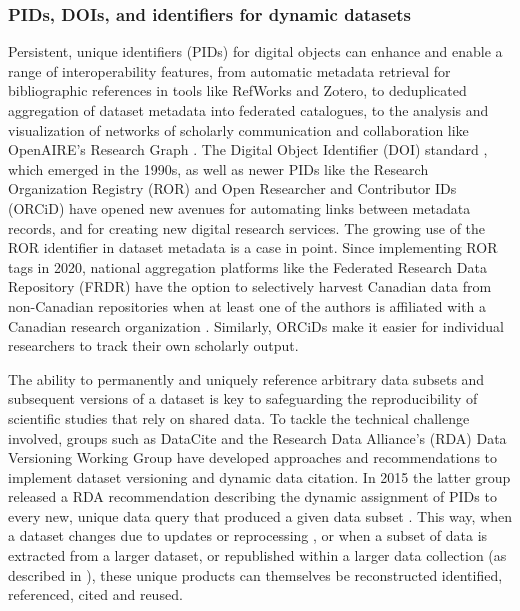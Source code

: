 \documentclass{interact}
\begin{document}
\subsubsection{PIDs, DOIs, and identifiers for dynamic datasets}

Persistent, unique identifiers (PIDs) for digital objects can enhance and enable a range of interoperability features, from automatic metadata retrieval for bibliographic references in tools like RefWorks and Zotero, to deduplicated aggregation of dataset metadata into federated catalogues, to the analysis and visualization of networks of scholarly communication and collaboration like OpenAIRE's Research Graph \parencite{manghi_openaire_2019}. The Digital Object Identifier (DOI) standard \parencite{paskin_doi_1999}, which emerged in the 1990s, as well as newer PIDs like the Research Organization Registry (ROR) and Open Researcher and Contributor IDs (ORCiD) have opened new avenues for automating links between metadata records, and for creating new digital research services. The growing use of the ROR identifier in dataset metadata is a case in point. Since implementing ROR tags in 2020, national aggregation platforms like the Federated Research Data Repository (FRDR) have the option to selectively harvest Canadian data from non-Canadian repositories when at least one of the authors is affiliated with a Canadian research organization \parencite{portage_network_dryad_2021}. Similarly, ORCiDs make it easier for individual researchers to track their own scholarly output.

The ability to permanently and uniquely reference arbitrary data subsets and subsequent versions of a dataset is key to safeguarding the reproducibility of scientific studies that rely on shared data. To tackle the technical challenge involved, groups such as DataCite \parencite{datacite_metadata_working_group_datacite_2019} and the Research Data Alliance's (RDA) Data Versioning Working Group \parencite{klump_versioning_2021, klump_compilation_2020} have developed approaches and recommendations to implement dataset versioning and dynamic data citation. In 2015 the latter group released a RDA recommendation describing the dynamic assignment of PIDs to every new, unique data query that produced a given data subset \parencite{rauber_data_citation_2015}. This way, when a dataset changes due to updates or reprocessing \parencite{klump_versioning_2021}, or when a subset of data is extracted from a larger dataset, or republished within a larger data collection (as described in \cite{klump_doi_2016}), these unique products can themselves be reconstructed identified, referenced, cited and reused.
\end{document}
